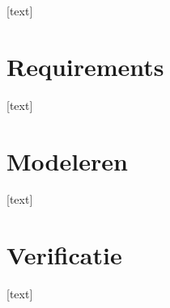 \documentclass{article}
\begin{document}
		[text]

	
	\newpage
	
	
	\section{Requirements}
	

		[text]

	
	\newpage

	
	\section{Modeleren}
	

		[text]

	
	\newpage

	
	\section{Verificatie}


		[text]

	
	\newpage
	
	
	 
	
\end{document}
